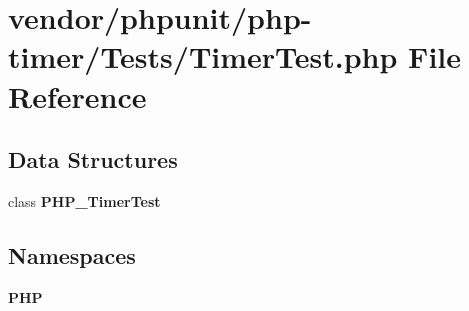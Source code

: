 \section{vendor/phpunit/php-\/timer/\+Tests/\+Timer\+Test.php File Reference}
\label{_timer_test_8php}
\subsection*{Data Structures}
\begin{DoxyCompactItemize}
\item 
class {\bf P\+H\+P\+\_\+\+Timer\+Test}
\end{DoxyCompactItemize}
\subsection*{Namespaces}
\begin{DoxyCompactItemize}
\item 
 {\bf P\+H\+P}
\end{DoxyCompactItemize}
